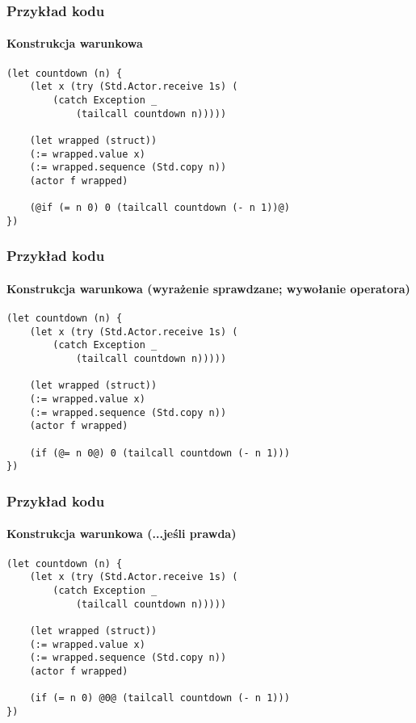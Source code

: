 \documentclass{beamer}
\begin{document}
\begin{frame}[fragile]
    \frametitle{Przykład kodu}
    \framesubtitle{Konstrukcja warunkowa}

    \begin{small}
    \begin{lstlisting}
(let countdown (n) {
    (let x (try (Std.Actor.receive 1s) (
        (catch Exception _
            (tailcall countdown n)))))

    (let wrapped (struct))
    (:= wrapped.value x)
    (:= wrapped.sequence (Std.copy n))
    (actor f wrapped)

    (@if (= n 0) 0 (tailcall countdown (- n 1))@)
})
    \end{lstlisting}
    \end{small}
\end{frame}

\begin{frame}[fragile]
    \frametitle{Przykład kodu}
    \framesubtitle{Konstrukcja warunkowa (wyrażenie sprawdzane; wywołanie operatora)}

    \begin{small}
    \begin{lstlisting}
(let countdown (n) {
    (let x (try (Std.Actor.receive 1s) (
        (catch Exception _
            (tailcall countdown n)))))

    (let wrapped (struct))
    (:= wrapped.value x)
    (:= wrapped.sequence (Std.copy n))
    (actor f wrapped)

    (if (@= n 0@) 0 (tailcall countdown (- n 1)))
})
    \end{lstlisting}
    \end{small}
\end{frame}

\begin{frame}[fragile]
    \frametitle{Przykład kodu}
    \framesubtitle{Konstrukcja warunkowa (...jeśli prawda)}

    \begin{small}
    \begin{lstlisting}
(let countdown (n) {
    (let x (try (Std.Actor.receive 1s) (
        (catch Exception _
            (tailcall countdown n)))))

    (let wrapped (struct))
    (:= wrapped.value x)
    (:= wrapped.sequence (Std.copy n))
    (actor f wrapped)

    (if (= n 0) @0@ (tailcall countdown (- n 1)))
})
    \end{lstlisting}
    \end{small}
\end{frame}
\end{document}
